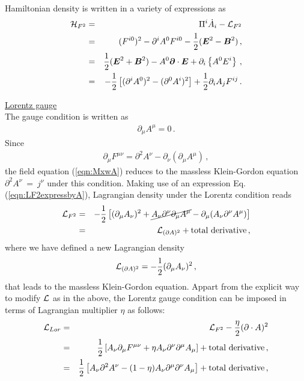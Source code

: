 Hamiltonian density is written in a variety of expressions as
\begin{eqnarray}
{\cal H}_{F^2} 
&=&
 \Pi^i \dot{A}_i - {\cal L}_{F^2}
\nonumber\\
&=&
(F^{i0})^2 - \partial^i A^0 F^{i0} - \frac{1}{2}(\mbox{\boldmath $E$}^2 - \mbox{\boldmath $B$}^2) \,,
\nonumber\\
&=&
\frac{1}{2} (\mbox{\boldmath $E$}^2 + \mbox{\boldmath $B$}^2) 
- A^0 \mbox{\boldmath $\partial$}\cdot \mbox{\boldmath $E$}
+ \partial_i
\left\{
A^0 E^i
\right\} \,,
\label{eqn:F2HamiltDensEB}
\\
&=&
-\frac{1}{2}
\left[
(\partial^i A^0)^2 - (\partial^0 A^i)^2
\right]
+
\frac{1}{2}
\partial_i A_j F^{ij} \,.
\label{eqn:F2HamiltDensA}
\end{eqnarray}

\bigskip
\noindent
\underline{Lorentz gauge}\\
The gauge condition is written as
\begin{eqnarray}
\partial_\mu A^\mu = 0 \,.
\label{eqn:LorentzCond}
\end{eqnarray}
Since
\begin{eqnarray}
\partial_\mu F^{\mu \nu} = \partial^2 A^\nu - \partial_\nu (\partial_\mu A^\mu)
\,,
\end{eqnarray}
the field equation (\ref{eqn:MxwA}) reduces to the massless Klein-Gordon equation
$\partial^2 A^\nu~=~j^\nu$ under this condition.
Making use of an expression Eq. (\ref{eqn:LF2expressbyA}), Lagrangian density under 
the Lorentz condition reads
\begin{eqnarray}
{\cal L}_{F^2}
&=&
- \frac{1}{2}
\left[
(\partial_\mu A_\nu)^2 + 
\cancel
{
A_\nu \partial^\nu 
\partial_\mu A^\mu
}
- \partial_\mu (A_\nu \partial^\nu A^\mu)
\right]
\nonumber\\
&=&
{\cal L}_{(\partial A)^2} + \mbox{total derivative}
\,,
\label{eqn:LagF2Lorentz}
\end{eqnarray}
where we have defined a new Lagrangian density
\begin{eqnarray}
{\cal L}_{(\partial A)^2}
=
- \frac{1}{2}
(\partial_\mu A_\nu)^2 \,,
\label{eqn:LagdenDA2}
\end{eqnarray}
that leads to the massless Klein-Gordon equation.
Appart from the explicit way to modify ${\cal L}$ as in the above, 
the Lorentz gauge condition can be imposed in terms of Lagrangian
multiplier $\eta$ as follows:
\begin{eqnarray}
{\cal L}_{Lor}
&=&
{\cal L}_{F^2}
-
\frac{\eta}{2} (\partial \cdot A)^2
\nonumber\\
&=&
\frac{1}{2}
\left[
A_\nu \partial_\mu F^{\mu \nu}
+
\eta A_\nu \partial^\nu \partial^\mu A_\mu
\right]
+ \mbox{total derivative} \,,
\nonumber\\
&=&
\frac{1}{2}
\left[
A_\nu \partial^2 A^\nu - (1 - \eta) A_\nu \partial^\mu \partial^\nu A_\mu
\right]
+ \mbox{total derivative} \,,
\label{eqn:LorentzLagmultip}
\end{eqnarray}
